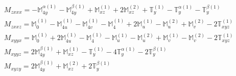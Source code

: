 \documentclass[fleqn,8pt,landscape]{jsarticle}
\begin{document}
\begin{align*}
& M_{zxxx} = - \mathbb{M}_{4y}^{\alpha(1)} - \mathbb{M}_{4y}^{\beta(1)} + \mathbb{M}_{xz}^{(1)} + 2 \mathbb{M}_{xz}^{(2)} + \mathbb{T}_{y}^{(1)} - \mathbb{T}_{y}^{\alpha(1)} - \mathbb{T}_{y}^{\beta(1)} \\
& M_{zxxz} = \mathbb{M}_{0}^{(1)} - \mathbb{M}_{4u}^{(1)} - \mathbb{M}_{4v}^{(1)} - \mathbb{M}_{4}^{(1)} + 2 \mathbb{M}_{u}^{(1)} - \mathbb{M}_{u}^{(2)} + \mathbb{M}_{v}^{(2)} - 2 \mathbb{T}_{xyz}^{(1)} \\
& M_{xyyx} = \mathbb{M}_{0}^{(1)} + 2 \mathbb{M}_{4u}^{(1)} - \mathbb{M}_{4}^{(1)} - \mathbb{M}_{u}^{(1)} - \mathbb{M}_{u}^{(2)} + \mathbb{M}_{v}^{(1)} - \mathbb{M}_{v}^{(2)} - 2 \mathbb{T}_{xyz}^{(1)} \\
& M_{xyyz} = 2 \mathbb{M}_{4y}^{\beta(1)} + \mathbb{M}_{xz}^{(1)} - \mathbb{T}_{y}^{(1)} - 4 \mathbb{T}_{y}^{\alpha(1)} - 2 \mathbb{T}_{y}^{\beta(1)} \\
& M_{xyzy} = 2 \mathbb{M}_{4y}^{\beta(1)} + \mathbb{M}_{xz}^{(2)} + 2 \mathbb{T}_{y}^{\beta(1)}
\end{align*}
\end{document}
